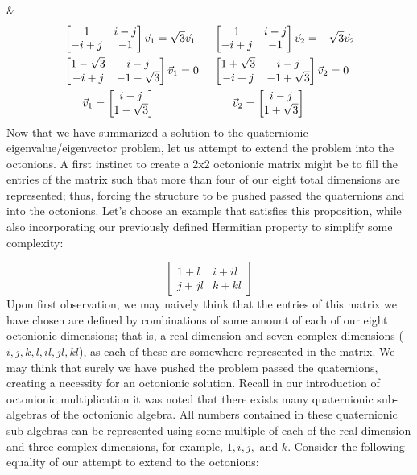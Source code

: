 \documentclass{article}
\theoremstyle{plain}
\begin{document}
&\begin{align*}
&\begin{bmatrix}1 & i-j\\-i+j & -1\end{bmatrix}\vec{v}_1     = \sqrt{3} \vec{v}_1 & \hspace{1mm} &\begin{bmatrix}1 & i-j\\-i+j & -1\end{bmatrix} \vec{v}_2    = -\sqrt{3}\vec{v}_2 \\
&\begin{bmatrix}1-\sqrt{3} & i-j\\-i+j & -1-\sqrt{3}\end{bmatrix}\vec{v}_1     = 0 & \hspace{1mm} &\begin{bmatrix}1+\sqrt{3} & i-j\\-i+j & -1+\sqrt{3}\end{bmatrix} \vec{v}_2    = 0\\
& \hspace{6mm} \vec{v}_1            =\begin{bmatrix}i-j\\1-\sqrt{3}\end{bmatrix}           & \hspace{1mm} &\hspace{6mm} \vec{v}_2    =\begin{bmatrix}i-j\\1+\sqrt{3}\end{bmatrix}
\end{align*}
Now that we have summarized a solution to the quaternionic eigenvalue/eigenvector problem, let us attempt to extend the problem into the octonions. A first instinct to create a 2x2 octonionic matrix might be to fill the entries of the matrix such that more than four of our eight total dimensions are represented; thus, forcing the structure to be pushed passed the quaternions and into the octonions. Let's choose an example that satisfies this proposition, while also incorporating our previously defined Hermitian property to simplify some complexity:

$$
\begin{bmatrix}
1+l & i+il\\
j+jl & k+kl
\end{bmatrix}
$$
Upon first observation, we may naively think that the entries of this matrix we have chosen are defined by combinations of some amount of each of our eight octonionic dimensions; that is, a real dimension and seven complex dimensions ($i,j,k,l,il,jl,kl$), as each of these are somewhere represented in the matrix. We may think that surely we have pushed the problem passed the quaternions, creating a necessity for an octonionic solution. Recall in our introduction of octonionic multiplication it was noted that there exists many quaternionic sub-algebras of the octonionic algebra. All numbers contained in these quaternionic sub-algebras can be represented using some multiple of each of the real dimension and three complex dimensions, for example, $1,i,j,$ and $k$. Consider the following equality of our attempt to extend to the octonions:
\end{document}
